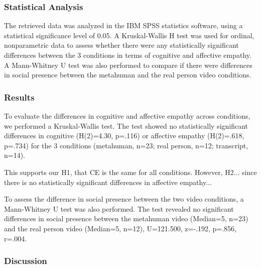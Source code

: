 \subsubsection{Statistical Analysis}
The retrieved data was analyzed in the IBM SPSS statistics software, using a statistical significance level of 0.05.
A Kruskal-Wallis H test was used for ordinal, nonparametric data to assess whether there were any statistically significant differences between the 3 conditions in terms of cognitive and affective empathy. A Mann-Whitney U test was also performed to compare if there were differences in social presence between the metahuman and the real person video conditions.

\subsubsection{Results}
To evaluate the differences in cognitive and affective empathy across conditions, we performed a Kruskal-Wallis test. The test showed no statistically significant differences in cognitive (H(2)=4.30, p=.116) or affective empathy (H(2)=.618, p=.734) for the 3 conditions (metahuman, n=23; real person, n=12; transcript, n=14).


This supports our H1, that CE is the same for all conditions. However, H2... since there is no statistically significant differences in affective empathy...

To assess the difference in social presence between the two video conditions, a Mann-Whitney U test was also performed. The test revealed no significant differences in social presence between the metahuman video (Median=5, n=23) and the real person video (Median=5, n=12), U=121.500, z=-.192, p=.856, r=.004.

\subsubsection{Discussion}